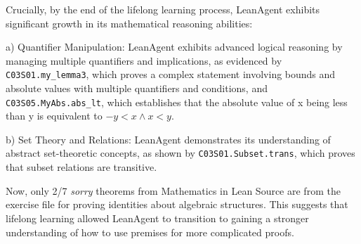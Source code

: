 \documentclass{article} %
\begin{document}
Crucially, by the end of the lifelong learning process, LeanAgent exhibits significant growth in its mathematical reasoning abilities:



a) Quantifier Manipulation:
LeanAgent exhibits advanced logical reasoning by managing multiple quantifiers and implications, as evidenced by \texttt{C03S01.my\_lemma3}, which proves a complex statement involving bounds and absolute values with multiple quantifiers and conditions, and \texttt{C03S05.MyAbs.abs\_lt}, which establishes that the absolute value of x being less than y is equivalent to $-y < x \land x < y$.

b) Set Theory and Relations:
LeanAgent demonstrates its understanding of abstract set-theoretic concepts, as shown by \texttt{C03S01.Subset.trans}, which proves that subset relations are transitive.

Now, only 2/7 \textit{sorry} theorems from Mathematics in Lean Source are from the exercise file for proving identities about algebraic structures. This suggests that lifelong learning allowed LeanAgent to transition to gaining a stronger understanding of how to use premises for more complicated proofs.

\end{document}
